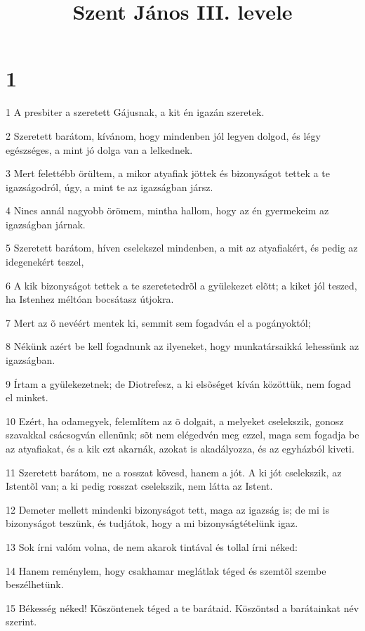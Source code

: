 

\title{Szent János III. levele}


\chapter{1}

\par 1 A presbiter a szeretett Gájusnak, a kit én igazán szeretek.
\par 2 Szeretett barátom, kívánom, hogy mindenben jól legyen dolgod, és légy egészséges, a mint jó dolga van a lelkednek.
\par 3 Mert felettébb örültem, a mikor atyafiak jöttek és bizonyságot tettek a te igazságodról, úgy, a mint te az igazságban jársz.
\par 4 Nincs annál nagyobb örömem, mintha hallom, hogy az én gyermekeim az igazságban járnak.
\par 5 Szeretett barátom, híven cselekszel mindenben, a mit az atyafiakért, és pedig az idegenekért teszel,
\par 6 A kik bizonyságot tettek a te szeretetedrõl a gyülekezet elõtt; a kiket jól teszed, ha Istenhez méltóan bocsátasz útjokra.
\par 7 Mert az õ nevéért mentek ki, semmit sem fogadván el a pogányoktól;
\par 8 Nékünk azért be kell fogadnunk az ilyeneket, hogy munkatársaikká lehessünk az igazságban.
\par 9 Írtam a gyülekezetnek; de Diotrefesz, a ki elsõséget kíván közöttük, nem fogad el minket.
\par 10 Ezért, ha odamegyek, felemlítem az õ dolgait, a melyeket cselekszik, gonosz szavakkal csácsogván ellenünk; sõt nem elégedvén meg ezzel, maga sem fogadja be az atyafiakat, és a kik ezt akarnák, azokat is akadályozza, és az egyházból kiveti.
\par 11 Szeretett barátom, ne a rosszat kövesd, hanem a jót. A ki jót cselekszik, az Istentõl  van; a ki pedig rosszat cselekszik, nem látta az Istent.
\par 12 Demeter mellett mindenki bizonyságot tett, maga az igazság is; de mi is bizonyságot teszünk, és tudjátok, hogy a mi bizonyságtételünk igaz.
\par 13 Sok írni valóm volna, de nem akarok tintával és tollal írni néked:
\par 14 Hanem reménylem, hogy csakhamar meglátlak téged és szemtõl szembe beszélhetünk.
\par 15 Békesség néked! Köszöntenek téged a te barátaid. Köszöntsd a barátainkat név szerint.


